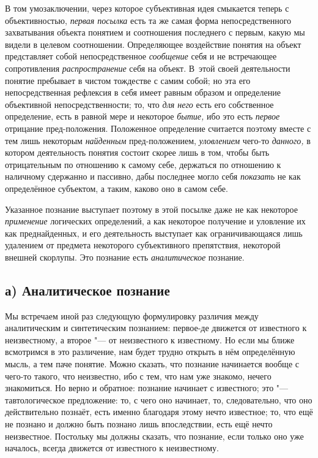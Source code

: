 В том умозаключении, через которое субъективная идея смыкается
теперь с объективностью, {\em первая
посылка} есть та же самая форма непосредственного
захватывания объекта понятием и соотношения последнего с первым, какую мы
видели в целевом соотношении. Определяющее воздействие понятия на объект
представляет собой непосредственное
{\em сообщение} себя и не
встречающее сопротивления
{\em распространение}
себя на объект. В~этой своей деятельности понятие пребывает в
чистом тождестве с самим собой; но эта его непосредственная рефлексия в
себя имеет равным образом и определение объективной непосредственности; то,
что {\em для него} есть
его собственное определение, есть в равной мере и некоторое
{\em бытие,} ибо это есть
{\em первое} отрицание
пред-положения. Положенное определение считается поэтому вместе
с тем лишь некоторым {\em найденным}
пред-положением,
{\em уловлением} чего-то
{\em данного,} в котором
деятельность понятия состоит скорее лишь в том, чтобы быть отрицательным по
отношению к самому себе, держаться по отношению к наличному сдержанно и
пассивно, дабы последнее могло себя
{\em показать} не как
определённое субъектом, а таким, каково оно в самом себе.

Указанное познание выступает поэтому в этой посылке даже не
как некоторое {\em применение}
логических определений, а как некоторое получение и уловление
их как преднайденных, и его деятельность выступает как ограничивающаяся
лишь удалением от предмета некоторого субъективного препятствия, некоторой
внешней скорлупы. Это познание есть
{\em аналитическое}
познание.

\subsection[а) Аналитическое познание]{а) Аналитическое познание}

Мы встречаем иной раз следующую формулировку различия между
аналитическим и синтетическим познанием: первое-де движется от известного к
неизвестному, а второе "--- от неизвестного к известному. Но
если мы ближе всмотримся в это различение, нам будет трудно открыть в нём
определённую мысль, а тем паче понятие. Можно сказать, что познание
начинается вообще с чего-то такого, что неизвестно, ибо с тем, что нам уже
знакомо, нечего знакомиться. Но верно и обратное: познание начинает с
известного; это "--- тавтологическое предложение: то, с чего
оно начинает, то, следовательно, что оно действительно познаёт, есть именно
благодаря этому нечто известное; то, что ещё не познано и должно быть
познано лишь впоследствии, есть ещё нечто неизвестное. Постольку мы
должны сказать, что познание, если только оно уже началось,
всегда движется от известного к неизвестному.

